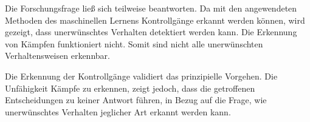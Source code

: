 Die Forschungsfrage ließ sich teilweise beantworten. Da mit den angewendeten Methoden des maschinellen Lernens Kontrollgänge erkannt werden können, wird gezeigt, dass unerwünschtes Verhalten detektiert werden kann. Die Erkennung von Kämpfen funktioniert nicht. Somit sind nicht alle unerwünschten Verhaltensweisen erkennbar.\par

Die Erkennung der Kontrollgänge validiert das prinzipielle Vorgehen. Die Unfähigkeit Kämpfe zu erkennen, zeigt jedoch, dass die getroffenen Entscheidungen zu keiner Antwort führen, in Bezug auf die Frage, wie unerwünschtes Verhalten jeglicher Art erkannt werden kann. 